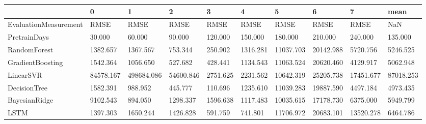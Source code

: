 \begin{tabular}{llllllllll}
\toprule
{} &         0 &          1 &         2 &        3 &        4 &         5 &         6 &         7 &      mean \\
\midrule
EvaluationMeasurement &      RMSE &       RMSE &      RMSE &     RMSE &     RMSE &      RMSE &      RMSE &      RMSE &       NaN \\
PretrainDays          &    30.000 &     60.000 &    90.000 &  120.000 &  150.000 &   180.000 &   210.000 &   240.000 &   135.000 \\
RandomForest          &  1382.657 &   1367.567 &   753.344 &  250.902 & 1316.281 & 11037.703 & 20142.988 &  5720.756 &  5246.525 \\
GradientBoosting      &  1542.364 &   1056.650 &   527.682 &  428.441 & 1134.543 & 11063.524 & 20620.460 &  4129.917 &  5062.948 \\
LinearSVR             & 84578.167 & 498684.086 & 54600.846 & 2751.625 & 2231.562 & 10642.319 & 25205.738 & 17451.677 & 87018.253 \\
DecisionTree          &  1582.391 &    988.952 &   445.777 &  110.696 & 1235.610 & 11039.283 & 19887.590 &  4497.184 &  4973.435 \\
BayesianRidge         &  9102.543 &    894.050 &  1298.337 & 1596.638 & 1117.483 & 10035.615 & 17178.730 &  6375.000 &  5949.799 \\
LSTM                  &  1397.303 &   1650.244 &  1426.828 &  591.759 &  741.801 & 11706.972 & 20683.101 & 13520.278 &  6464.786 \\
\bottomrule
\end{tabular}
